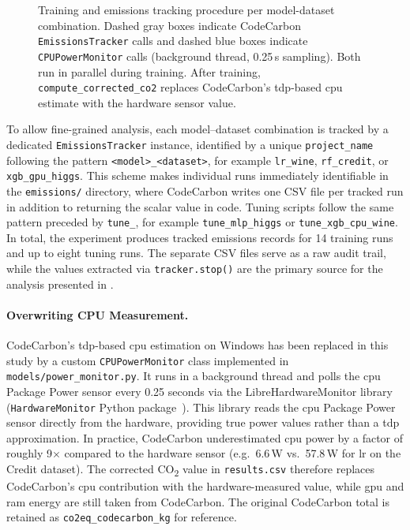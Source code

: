\begin{figure}[htbp]
{\begin{tikzpicture}
\end{tikzpicture}%
}
\caption[Training and emissions tracking procedure per model-dataset combination.]{Training and emissions tracking procedure per model-dataset combination.
Dashed gray boxes indicate CodeCarbon \texttt{EmissionsTracker} calls and dashed blue boxes indicate \texttt{CPUPowerMonitor} calls (background thread, 0.25\,s sampling). Both run in parallel during training. After training, \texttt{compute\_corrected\_co2} replaces CodeCarbon's \gls{tdp}-based \gls{cpu} estimate with the hardware sensor value.}
\label{fig:emissions_flow}
\end{figure}

To allow fine-grained analysis, each model–dataset combination is tracked by a dedicated \texttt{EmissionsTracker} instance, identified by a unique \texttt{project\_name} following the pattern \texttt{<model>\_<dataset>}, for example \texttt{lr\_wine}, \texttt{rf\_credit}, or \texttt{xgb\_gpu\_higgs}. This scheme makes individual runs immediately identifiable in the \texttt{emissions/} directory, where CodeCarbon writes one CSV file per tracked run in addition to returning the scalar value in code. Tuning scripts follow the same pattern preceded by \texttt{tune\_}, for example \texttt{tune\_mlp\_higgs} or \texttt{tune\_xgb\_cpu\_wine}. In total, the experiment produces tracked emissions records for 14 training runs and up to eight tuning runs. The separate CSV files serve as a raw audit trail, while the values extracted via \texttt{tracker.stop()} are the primary source for the analysis presented in .

\paragraph{Overwriting CPU Measurement.}
CodeCarbon's \gls{tdp}-based \gls{cpu} estimation on Windows has been replaced in this study by a custom \texttt{CPUPowerMonitor} class implemented in \texttt{models/power\_monitor.py}. It runs in a background thread and polls the \gls{cpu} Package Power sensor every 0.25 seconds via the LibreHardwareMonitor library (\texttt{HardwareMonitor} Python package~\cite{feixSnip3rnickPyHardwareMonitor2026}). This library reads the \gls{cpu} Package Power sensor directly from the hardware, providing true power values rather than a \gls{tdp} approximation. In practice, CodeCarbon underestimated \gls{cpu} power by a factor of roughly 9$\times$ compared to the hardware sensor (e.g.\ 6.6\,W vs.\ 57.8\,W for \gls{lr} on the Credit dataset). The corrected CO\textsubscript{2} value in \texttt{results.csv} therefore replaces CodeCarbon's \gls{cpu} contribution with the hardware-measured value, while \gls{gpu} and \gls{ram} energy are still taken from CodeCarbon. The original CodeCarbon total is retained as \texttt{co2eq\_codecarbon\_kg} for reference.

